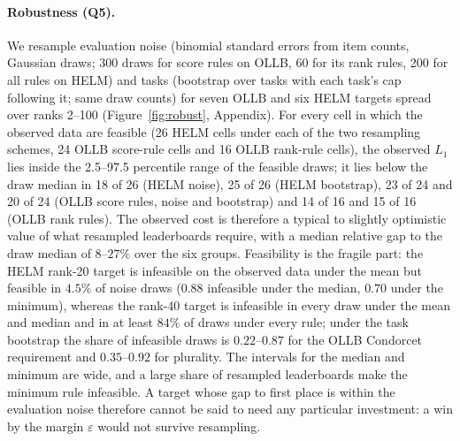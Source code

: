 \documentclass{article}
\begin{document}
\paragraph{Robustness (Q5).}
We resample evaluation noise (binomial standard errors from item counts, Gaussian draws; 300 draws for score rules on OLLB, 60 for its rank rules, 200 for all rules on HELM) and tasks (bootstrap over tasks with each task's cap following it; same draw counts) for seven OLLB and six HELM targets spread over ranks 2--100 (Figure~\ref{fig:robust}, Appendix). For every cell in which the observed data are feasible (26 HELM cells under each of the two resampling schemes, 24 OLLB score-rule cells and 16 OLLB rank-rule cells), the observed $L_1$ lies inside the 2.5--97.5 percentile range of the feasible draws; it lies below the draw median in 18 of 26 (HELM noise), 25 of 26 (HELM bootstrap), 23 of 24 and 20 of 24 (OLLB score rules, noise and bootstrap) and 14 of 16 and 15 of 16 (OLLB rank rules). The observed cost is therefore a typical to slightly optimistic value of what resampled leaderboards require, with a median relative gap to the draw median of $8$--$27\%$ over the six groups. Feasibility is the fragile part: the HELM rank-20 target is infeasible on the observed data under the mean but feasible in $4.5\%$ of noise draws ($0.88$ infeasible under the median, $0.70$ under the minimum), whereas the rank-40 target is infeasible in every draw under the mean and median and in at least $84\%$ of draws under every rule; under the task bootstrap the share of infeasible draws is $0.22$--$0.87$ for the OLLB Condorcet requirement and $0.35$--$0.92$ for plurality. The intervals for the median and minimum are wide, and a large share of resampled leaderboards make the minimum rule infeasible. A target whose gap to first place is within the evaluation noise therefore cannot be said to need any particular investment: a win by the margin $\varepsilon$ would not survive resampling.
\end{document}
